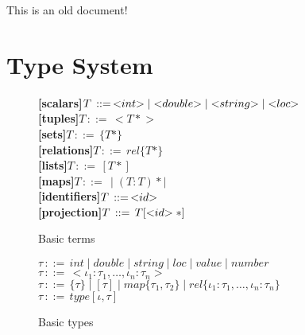 \documentclass{article}
\begin{document}
This is an old document!

\section{Type System}
\label{sec:typeSystem}


\newcommand{\ifthenRule}[2]{\underline{#1}\\ #2\\}

\newcommand{\typeRule}[2]{
  \refstepcounter{rule}
  \ifthenRule{#1}{#2}\\
}
\newcommand{\subTypeRule}[2]{
  \refstepcounter{subtyperule}
  $#1 \leq #2$\\ \\
}
\newcommand{\iffTypeRule}[2]{
  \refstepcounter{subtyperule}
  $#1 \Leftrightarrow #2$\\ \\
}
\newcommand{\eqTypeRule}[2]{
  \refstepcounter{subtyperule}
  $#1\: \equiv\: #2$\\ \\
}
\newcommand{\judgment}[1]{$\Gamma \models #1$}
\newcommand{\hasType}[2]{#1\,:\,#2}
\newcommand{\scalar}[1]{<\negthickspace#1\negthickspace>}
\newcommand{\produces}{::=}
\newcommand{\termDef}[2]{{\bfseries[#1]}\;$T\,\produces\,#2$\\}
\newcommand{\typeDef}[1]{$\tau\,\produces\,#1$\\}
\newcommand{\tupleOf}[1]{<\!#1\!>}
\newcommand{\setOf}[1]{\{#1\}}
\newcommand{\relOf}[1]{rel\{#1\}}
\newcommand{\mapOf}[1]{map\{#1\}}
\newcommand{\listOf}[1]{[#1]}
\newcommand{\ident}{<\negthickspace id\negthickspace>}

\begin{figure*}
\termDef{scalars}{\scalar{int} | \scalar{double} | \scalar{string} | \scalar{loc}}
\termDef{tuples}{\tupleOf{T*}}
\termDef{sets}{\setOf{T*}}
\termDef{relations}{\relOf{T*}}
\termDef{lists}{\listOf{T*}}
\termDef{maps}{\mid(T:T)*\mid}
\termDef{identifiers}{\ident}
\termDef{projection}{T[\ident*]}
\caption{Basic terms}
\label{fig:basicTerms}
\end{figure*}

\begin{figure*}
\typeDef{int \mid double \mid string \mid loc \mid value \mid number}
\typeDef{\tupleOf{\iota_1:\tau_1,\ldots,\iota_n:\tau_n}}
\typeDef{\setOf{\tau} \mid \listOf{\tau} \mid \mapOf{\tau_1,\tau_2} \mid \relOf{\iota_1:\tau_1,\ldots,\iota_n:\tau_n}}
\typeDef{type[\iota,\tau]}
\caption{Basic types}
\label{fig:basicTypes}
\end{figure*}
\end{document}
